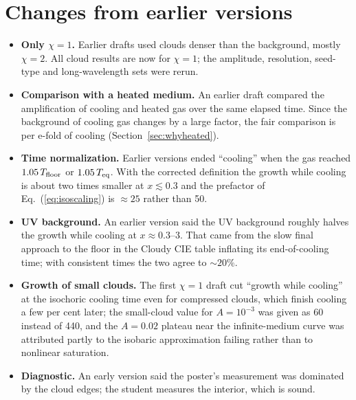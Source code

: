 \documentclass[11pt]{article}
\newcommand{\Teq}{T_{\rm eq}}
\newcommand{\Tfl}{T_{\rm floor}}
\begin{document}
\section{Changes from earlier versions}
\label{app:corrections}
\begin{itemize}
\item \textbf{Only $\chi=1$.} Earlier drafts used clouds denser than the
  background, mostly $\chi=2$. All cloud results are now for $\chi=1$; the
  amplitude, resolution, seed-type and long-wavelength sets were rerun.
\item \textbf{Comparison with a heated medium.} An earlier draft compared the
  amplification of cooling and heated gas over the same elapsed time. Since the
  background of cooling gas changes by a large factor, the fair comparison is per
  e-fold of cooling (Section~\ref{sec:whyheated}).
\item \textbf{Time normalization.} Earlier versions ended ``cooling'' when the gas
  reached $1.05\,\Tfl$ or $1.05\,\Teq$. With the corrected definition the growth
  while cooling is about two times smaller at $x\lesssim0.3$ and the prefactor of
  Eq.~(\ref{eq:isoscaling}) is $\approx25$ rather than 50.
\item \textbf{UV background.} An earlier version said the UV background roughly
  halves the growth while cooling at $x\approx0.3$--3. That came from the slow final
  approach to the floor in the Cloudy CIE table inflating its end-of-cooling time;
  with consistent times the two agree to $\sim20\%$.
\item \textbf{Growth of small clouds.} The first $\chi=1$ draft cut ``growth while
  cooling'' at the isochoric cooling time even for compressed clouds, which finish
  cooling a few per cent later; the small-cloud value for $A=10^{-3}$ was given as 60
  instead of 440, and the $A=0.02$ plateau near the infinite-medium curve was
  attributed partly to the isobaric approximation failing rather than to
  nonlinear saturation.
\item \textbf{Diagnostic.} An early version said the poster's measurement was
  dominated by the cloud edges; the student measures the interior, which is sound.
\end{itemize}
\end{document}
